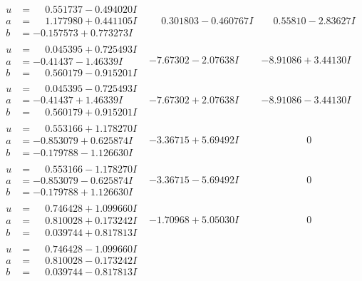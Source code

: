 \documentclass[1p]{elsarticle_modified}
\theoremstyle{definition}
\begin{document}
$$\begin{array}{c|c|c}
\begin{aligned}
u &= \phantom{-}0.551737 - 0.494020 I \\
a &= \phantom{-}1.177980 + 0.441105 I \\
b &= -0.157573 + 0.773273 I\end{aligned}
 & \phantom{-}0.301803 - 0.460767 I & \phantom{-}0.55810 - 2.83627 I \\ \hline\begin{aligned}
u &= \phantom{-}0.045395 + 0.725493 I \\
a &= -0.41437 - 1.46339 I \\
b &= \phantom{-}0.560179 - 0.915201 I\end{aligned}
 & -7.67302 - 2.07638 I & -8.91086 + 3.44130 I \\ \hline\begin{aligned}
u &= \phantom{-}0.045395 - 0.725493 I \\
a &= -0.41437 + 1.46339 I \\
b &= \phantom{-}0.560179 + 0.915201 I\end{aligned}
 & -7.67302 + 2.07638 I & -8.91086 - 3.44130 I \\ \hline\begin{aligned}
u &= \phantom{-}0.553166 + 1.178270 I \\
a &= -0.853079 + 0.625874 I \\
b &= -0.179788 - 1.126630 I\end{aligned}
 & -3.36715 + 5.69492 I & \phantom{-0.000000 } 0 \\ \hline\begin{aligned}
u &= \phantom{-}0.553166 - 1.178270 I \\
a &= -0.853079 - 0.625874 I \\
b &= -0.179788 + 1.126630 I\end{aligned}
 & -3.36715 - 5.69492 I & \phantom{-0.000000 } 0 \\ \hline\begin{aligned}
u &= \phantom{-}0.746428 + 1.099660 I \\
a &= \phantom{-}0.810028 + 0.173242 I \\
b &= \phantom{-}0.039744 + 0.817813 I\end{aligned}
 & -1.70968 + 5.05030 I & \phantom{-0.000000 } 0 \\ \hline\begin{aligned}
u &= \phantom{-}0.746428 - 1.099660 I \\
a &= \phantom{-}0.810028 - 0.173242 I \\
b &= \phantom{-}0.039744 - 0.817813 I\end{aligned}

\end{array}$$
\end{document}
